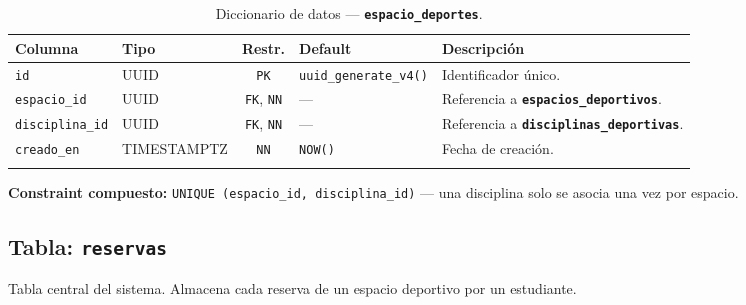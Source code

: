 \documentclass[12pt, a4paper]{article}
\newcommand{\pk}{\texttt{PK}}
\newcommand{\fk}{\texttt{FK}}
\newcommand{\nn}{\texttt{NN}}
\newcommand{\tname}[1]{\texttt{\textbf{#1}}}
\newcommand{\cname}[1]{\texttt{#1}}
\begin{document}
\begin{longtable}{l l c l p{5cm}}
    \toprule
    \textbf{Columna} & \textbf{Tipo} & \textbf{Restr.} & \textbf{Default} & \textbf{Descripción} \\
    \midrule
    \endhead
    \cname{id} & UUID & \pk & \texttt{uuid\_generate\_v4()} & Identificador único. \\
    \cname{espacio\_id} & UUID & \fk, \nn & --- & Referencia a \tname{espacios\_deportivos}. \\
    \cname{disciplina\_id} & UUID & \fk, \nn & --- & Referencia a \tname{disciplinas\_deportivas}. \\
    \cname{creado\_en} & TIMESTAMPTZ & \nn & \texttt{NOW()} & Fecha de creación. \\
    \bottomrule
    \caption{Diccionario de datos --- \tname{espacio\_deportes}.}
\end{longtable}

\textbf{Constraint compuesto:} \texttt{UNIQUE (espacio\_id, disciplina\_id)} --- una disciplina solo se asocia una vez por espacio.

\subsection{Tabla: \tname{reservas}}

Tabla central del sistema. Almacena cada reserva de un espacio deportivo por un estudiante.
\end{document}
